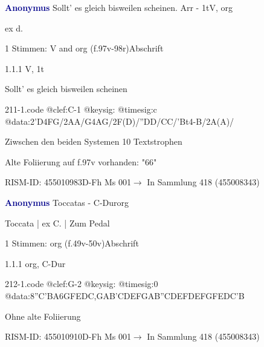 \documentclass[twocolumn, 12pt]{book}
\begin{document}
\par \vspace{16pt} \textcolor{darkblue}{\textbf{Anonymus  }}\hfillplus{\textbf{[211]}}\newline Sollt' es gleich bisweilen scheinen. Arr - 1t\newline V, org
\par \begin{itshape}[f.97v, at left:] ex d.\end{itshape} 
\par \textcolor{darkblue}{}  1 Stimmen: V and org  (f.97v-98r)\newline Abschrift
\par 1.1.1  V, 1t\newline \begin{footnotesize} Sollt' es gleich bisweilen scheinen \end{footnotesize}  
\begin{filecontents*}{211-1.code}
@clef:C-1
@keysig:
@timesig:c
@data:2'D4FG/2AA/G4AG/2F(D)/''DD/CC/'Bt4-B/2A(A)/
\end{filecontents*}
\newline %
\par Ziwschen den beiden Systemen 10 Textstrophen
\par Alte Foliierung auf f.97v vorhanden: "66"
\par RISM-ID: 455010983\newline D-Fh  Ms 001\newline $\rightarrow$ In Sammlung 418 (455008343)
      
\par \vspace{16pt} \textcolor{darkblue}{\textbf{Anonymus  }}\hfillplus{\textbf{[212]}}\newline Toccatas - C-Dur\newline org
\par \begin{itshape}[f.49v, at left:] Toccata | ex C. | Zum Pedal\end{itshape} 
\par \textcolor{darkblue}{}  1 Stimmen: org  (f.49v-50v)\newline Abschrift
\par 1.1.1  org, C-Dur  
\begin{filecontents*}{212-1.code}
@clef:G-2
@keysig:
@timesig:0
@data:8''C{'BA}{6GFED}{C,GAB}{'CDEF}{GAB''C}{DEFD}{EFGF}{EDC'B}
\end{filecontents*}
\newline %
\par Ohne alte Foliierung
\par RISM-ID: 455010910\newline D-Fh  Ms 001\newline $\rightarrow$ In Sammlung 418 (455008343)
      
\end{document}
